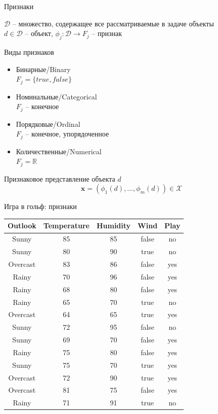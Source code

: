 \documentclass[aspectratio=169]{beamer}
\begin{document}
\begin{frame}{Признаки}

$\mathcal{D}$ -- множество, содержащее все рассматриваемые в задаче объекты \\
$d \in \mathcal{D}$ --  объект,  $\phi_j: \mathcal{D} \rightarrow F_j$ -- признак
    
\vspace{1em}
Виды признаков
\begin{itemize}
\item Бинарные/Binary \\ $F_j = \{true, false\}$
\item Номинальные/Categorical \\ $F_j$ -- конечное
\item Порядковые/Ordinal \\ $F_j$ -- конечное, упорядоченное
\item Количественные/Numerical \\ $F_j = \mathbb{R}$
\end{itemize}
\vspace{1em}
Признаковое представление объекта $d$
\[
\mathbf{x} = (\phi_1(d), \ldots, \phi_m(d)) \in \mathcal{X}
\]


\end{frame}

\begin{frame}{Игра в гольф: признаки}

\begin{center}
\begin{tabular}{c | c | c | c | c }
\bf Outlook & \bf Temperature & \bf Humidity & \bf Wind & \bf Play \\
\hline
Sunny & 85 & 85 & false & no \\
Sunny & 80 & 90 & true & no \\
Overcast & 83 & 86 & false & yes \\
Rainy & 70 & 96 & false & yes \\
Rainy & 68 & 80 & false & yes \\
Rainy & 65 & 70 & true & no \\
Overcast & 64 & 65 & true & yes \\
Sunny & 72 & 95 & false & no \\
Sunny & 69 & 70 & false & yes \\
Rainy & 75 & 80 & false & yes \\
Sunny & 75 & 70 & true & yes \\
Overcast & 72 & 90 & true & yes \\
Overcast & 81 & 75 & false & yes \\
Rainy & 71 & 91 & true & no \\
\end{tabular}
\end{center}

\end{frame}
\end{document}
